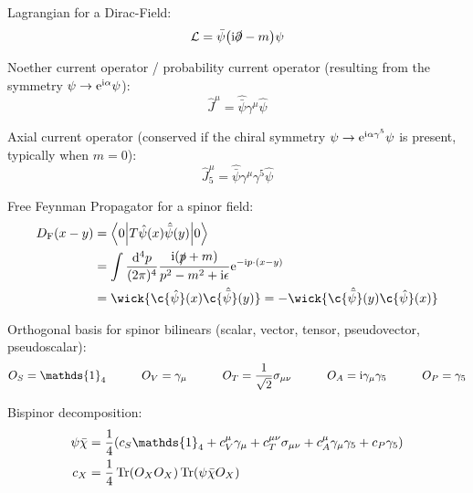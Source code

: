 			\noindent
			Lagrangian for a Dirac-Field:
			\begin{equation}
				\mathcal{L} = \bar{\psi} \qty(\mathrm{i} \slashed{\partial} - m) \psi
			\end{equation}

			\noindent
			Noether current operator / probability current operator (resulting from the symmetry $\psi \to \mathrm{e}^{\mathrm{i} \alpha} \psi$):
			\begin{equation}
				\hat{J}^\mu = \hat{\bar{\psi}} \gamma^\mu \hat{\psi}
			\end{equation}

			\noindent
			Axial current operator (conserved if the chiral symmetry $\psi \to \mathrm{e}^{\mathrm{i} \alpha \gamma^5} \psi$ is present, typically when $m=0$):
			\begin{equation}
				\hat{J}^\mu_5 = \hat{\bar{\psi}} \gamma^\mu \gamma^5 \hat{\psi}
			\end{equation}

			\noindent
			Free Feynman Propagator for a spinor field:
			\begin{equation}
				\begin{aligned}
					D_\text{F}(x-y) &= \mel**{0}{T\hat{\psi}(x)\hat{\bar\psi}(y)}{0} \\
					&= \int \frac{\dd^4 p}{(2\pi)^4} \frac{\i(\slashed{p}+m)}{p^2-m^2+\i\epsilon} \ex^{-\i p\cdot(x-y)} \\
					&= \wick{\c{\hat{\psi}}(x) \c{\hat{\bar{\psi}}}(y)} = - \wick{\c{\hat{\bar{\psi}}}(y) \c{\hat\psi}(x)}
				\end{aligned}
			\end{equation}

			\noindent
			Orthogonal basis for spinor bilinears (scalar, vector, tensor, pseudovector, pseudoscalar):
			\begin{equation}
				O_S = \mathds{1}_4
				\hsp
				O_V = \gamma_\mu
				\hsp
				O_T = \frac{1}{\sqrt{2}} \sigma_{\mu\nu}
				\hsp
				O_A = \i \gamma_\mu \gamma_5
				\hsp
				O_P = \gamma_5
			\end{equation}

			\noindent
			Bispinor decomposition:
			\begin{align}
				\psi\bar{\chi} &= \frac{1}{4} \qty( c_S \mathds{1}_4 + c_V^\mu \gamma_\mu + c_T^{\mu\nu} \sigma_{\mu\nu} + c_A^\mu \gamma_\mu \gamma_5 + c_P \gamma_5 ) \\
				c_X &= \frac{1}{4} \tr(O_X O_X) \tr(\psi \bar{\chi} O_X)
			\end{align}

